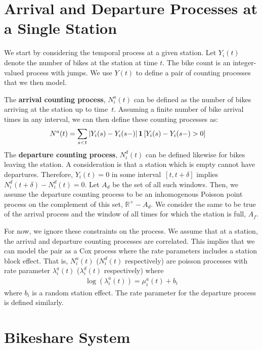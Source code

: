 \documentclass{acm_proc_article-sp}
\begin{document}
\section{Arrival and Departure Processes at a Single Station}

We start by considering the temporal process at a given station.  Let $Y_i (t)$ denote the number of bikes at the station at time $t$.  The bike count is an integer-valued process with jumps.  We use $Y(t)$ to define a pair of counting processes that we then model.

The {\bf arrival counting process}, $N_i^{a} (t)$ can be defined as the number of bikes arriving at the station up to time~$t$.  Assuming a finite number of bike arrival times in any interval, we can then define these counting processes as:
\begin{align}
N^{a} (t) &= \sum_{s < t} \left | Y_i (s) - Y_i (s-) \right | {\bf 1} \left[ Y_i (s) - Y_i (s-)  > 0 \right] 
\end{align}
The {\bf departure counting process}, $N_i^{d} (t)$ can be defined likewise for bikes leaving the station.  A consideration is that a station which is empty cannot have departures.  Therefore, $Y_i (t) = 0$ in some interval~$[t, t+\delta]$ implies $N_i^{d} (t+\delta) -N_i^{d} (t) = 0$.   Let $A_{d}$ be the set of all such windows.  Then, we assume the departure counting process to be an inhomogenous Poisson point process on the complement of this set, $\mathbb{R}^{+} - A_{d}$.  We consider the same to be true of the arrival process and the window of all times for which the station is full, $A_{f}$.

For now, we ignore these constraints on the process.  We assume that at a station, the arrival and departure counting processes are correlated.  This implies that we can model the pair as a Cox process where the rate parameters includes a station block effect. That is, $N_i^{a} (t)$ ($N_i^{d} (t)$ respectively) are poisson processes with rate parameter $\lambda_i^{a} (t)$ ($\lambda_i^{d} (t)$ respectively) where
\begin{align}
\log \left( \lambda_i^{a} (t) \right) = \mu^{a}_i(t) + b_i
\end{align}
\noindent where $b_i$ is a random station effect.  The rate parameter for the departure process is defined similarly.

\section{Bikeshare System}
\end{document}
